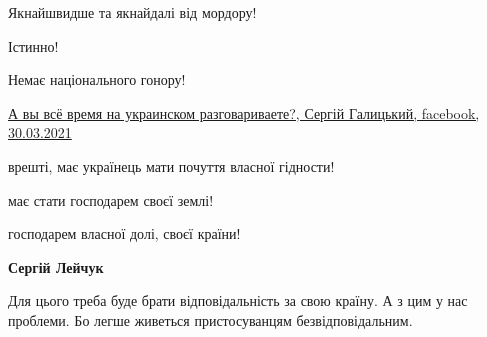 \begin{itemize}
Якнайшвидше та якнайдалі від мордору!

 
Істинно!

 
Немає національного гонору!

 
\href{https://m.facebook.com/story.php?story_fbid=286917759668714&id=100050514764917}{%
А вы всё время на украинском разговариваете?, Сергій Галицький, facebook, 30.03.2021%
}

 

врешті, має українець мати почуття власної гідности!

має стати господарем своєї землі!

господарем власної долі, своєї країни!

\begin{itemize}
 
\textbf{Сергій Лейчук} 

Для цього треба буде брати відповідальність за свою країну. А з цим у нас
проблеми. Бо легше живеться пристосуванцям безвідповідальним.

 

\end{itemize}
\end{itemize}
